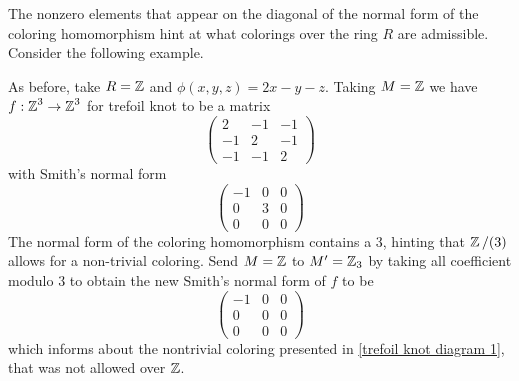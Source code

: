 
The nonzero elements that appear on the diagonal of the normal form of the coloring homomorphism hint at what colorings over the ring $R$ are admissible. Consider the following example.

\begin{example}\label{ex2}
  As before, take $R=\operatorname{\mathbb{Z}}$ and $\phi(x, y, z)=2x-y-z$. Taking $M=\operatorname{\mathbb{Z}}$ we have $f:\operatorname{\mathbb{Z}}^3\to \operatorname{\mathbb{Z}}^3$ for trefoil knot to be a matrix
  $$ 
  \begin{pmatrix}
    2 & -1 & -1 \\ 
    -1 & 2 & -1 \\ 
    -1 & -1 & 2
  \end{pmatrix}
  $$ 
  with Smith's normal form
  $$
  \begin{pmatrix}
    -1 & 0 & 0 \\ 
    0 & 3 & 0\\ 
    0 & 0 & 0
  \end{pmatrix}
  $$
  The normal form of the coloring homomorphism contains a $3$, hinting that $\operatorname{\mathbb{Z}}/(3)$ allows for a non-trivial coloring. Send $M=\operatorname{\mathbb{Z}}$ to $M'=\operatorname{\mathbb{Z}}_3$ by taking all coefficient modulo $3$ to obtain the new Smith's normal form of $f$ to be
  $$
  \begin{pmatrix}
    -1 & 0 & 0 \\ 
    0 & 0 & 0\\ 
    0 & 0 & 0
  \end{pmatrix}
  $$
  which informs about the nontrivial coloring presented in \cref{trefoil knot diagram 1}, that was not allowed over $\operatorname{\mathbb{Z}}$.
\end{example}

